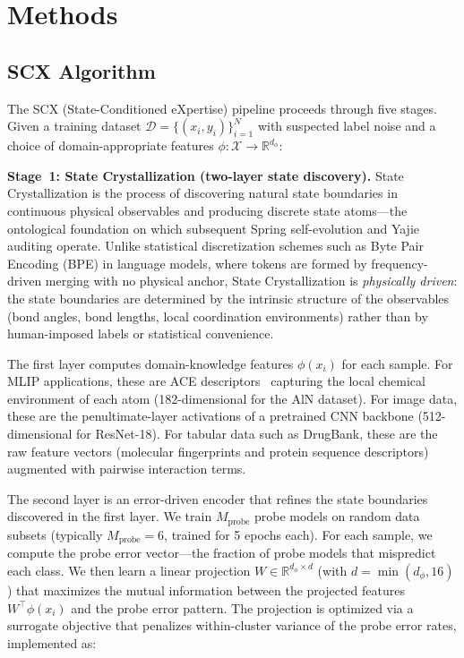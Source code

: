 %

\section{Methods}

\subsection{SCX Algorithm}

The SCX (State-Conditioned eXpertise) pipeline proceeds through five stages. Given a training dataset $\mathcal{D} = \{(x_i, y_i)\}_{i=1}^N$ with suspected label noise and a choice of domain-appropriate features $\phi \colon \mathcal{X} \to \mathbb{R}^{d_\phi}$:

\textbf{Stage~1: State Crystallization (two-layer state discovery).} State Crystallization is the process of discovering natural state boundaries in continuous physical observables and producing discrete state atoms---the ontological foundation on which subsequent Spring self-evolution and Yajie auditing operate. Unlike statistical discretization schemes such as Byte Pair Encoding (BPE) in language models, where tokens are formed by frequency-driven merging with no physical anchor, State Crystallization is \textit{physically driven}: the state boundaries are determined by the intrinsic structure of the observables (bond angles, bond lengths, local coordination environments) rather than by human-imposed labels or statistical convenience.

The first layer computes domain-knowledge features $\phi(x_i)$ for each sample. For MLIP applications, these are ACE descriptors~\cite{drautz2019ace} capturing the local chemical environment of each atom (182-dimensional for the AlN dataset). For image data, these are the penultimate-layer activations of a pretrained CNN backbone (512-dimensional for ResNet-18). For tabular data such as DrugBank, these are the raw feature vectors (molecular fingerprints and protein sequence descriptors) augmented with pairwise interaction terms.

The second layer is an error-driven encoder that refines the state boundaries discovered in the first layer. We train $M_{\mathrm{probe}}$ probe models on random data subsets (typically $M_{\mathrm{probe}} = 6$, trained for 5 epochs each). For each sample, we compute the probe error vector---the fraction of probe models that mispredict each class. We then learn a linear projection $W \in \mathbb{R}^{d_\phi \times d}$ (with $d = \min(d_\phi, 16)$) that maximizes the mutual information between the projected features $W^\top \phi(x_i)$ and the probe error pattern. The projection is optimized via a surrogate objective that penalizes within-cluster variance of the probe error rates, implemented as:

